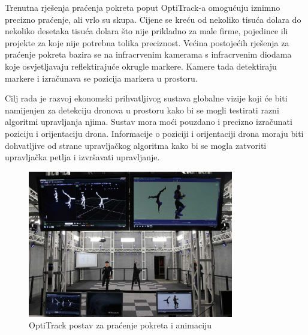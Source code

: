 \documentclass[times, utf8, diplomski]{fer}
\begin{document}
Trenutna rješenja praćenja pokreta poput OptiTrack-a omogućuju iznimno precizno praćenje, ali vrlo su skupa. Cijene se kreću od nekoliko tisuća dolara do nekoliko desetaka tisuća dolara što nije prikladno za male firme, pojedince ili projekte za koje nije potrebna tolika preciznost. Većina postojećih rješenja za praćenje pokreta bazira se na infracrvenim kamerama s infracrvenim diodama koje osvjetljavaju reflektirajuće okrugle markere. Kamere tada detektiraju markere i izračunava se pozicija markera u prostoru.

Cilj rada je razvoj ekonomski prihvatljivog sustava globalne vizije koji će biti namijenjen za detekciju dronova u prostoru kako bi se mogli testirati razni algoritmi upravljanja njima. Sustav mora moći pouzdano i precizno izračunati poziciju i orijentaciju drona. Informacije o poziciji i orijentaciji drona moraju biti dohvatljive od strane upravljačkog algoritma kako bi se mogla zatvoriti upravljačka petlja i izvršavati upravljanje.     

\begin{figure}[h]
\centering
\includegraphics[width=0.8\textwidth]{optitrack}
\caption{OptiTrack postav za praćenje pokreta i animaciju \protect\footnotemark[1]}
\end{figure}
\end{document}
